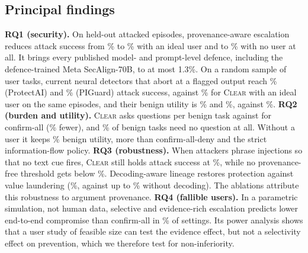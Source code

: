 \documentclass[preprint,12pt,nonatbib]{elsarticle}
\theoremstyle{remark}
\newcommand{\clear}{\textsc{Clear}}
\begin{document}
\subsection{Principal findings}
\label{sec:findings}
\textbf{RQ1 (security).} On \nHeldAtt{} held-out attacked episodes,
provenance-aware escalation reduces attack success from \asrNone\% to
\asrClearO\% with an ideal user and to \asrClearA\% with no user at all. It
brings every published model- and prompt-level defence, including the
defence-trained Meta SecAlign-70B, to at most 1.3\%. On a random sample of
\nDetTasks{} user tasks, current neural detectors that abort at a flagged output
reach \asrPai\% (ProtectAI) and \asrPig\% (PIGuard) attack success, against
\asrClearOS\% for \clear{} with an ideal user on the same episodes, and their
benign utility is \buPai\% and \buPig\%, against \buClearOS\%.
\textbf{RQ2 (burden and utility).} \clear{} asks \dlgClearO{} questions per benign
task against \dlgCallO{} for confirm-all (\dlgReduction\% fewer), and
\noDialogClear\% of benign tasks need no question at all. Without a user it keeps
\buClearA\% benign utility, more than confirm-all-deny and the strict
information-flow policy.
\textbf{RQ3 (robustness).} When attackers phrase injections so that no text cue
fires, \clear{} still holds attack success at \asrEvadeClear\%, while no
provenance-free threshold gets below \asrEvadeNoProvMin\%. Decoding-aware lineage
restores protection against value laundering (\laundVtwoVal\%, against up to
\laundVoneMax\% without decoding). The ablations attribute this robustness to
argument provenance.
\textbf{RQ4 (fallible users).} In a parametric simulation, not human data,
selective and evidence-rich escalation predicts lower end-to-end compromise than
confirm-all in \simShare\% of \simGridN{} settings. Its power analysis shows that a
user study of feasible size can test the evidence effect, but not a selectivity
effect on prevention, which we therefore test for non-inferiority.
\end{document}
